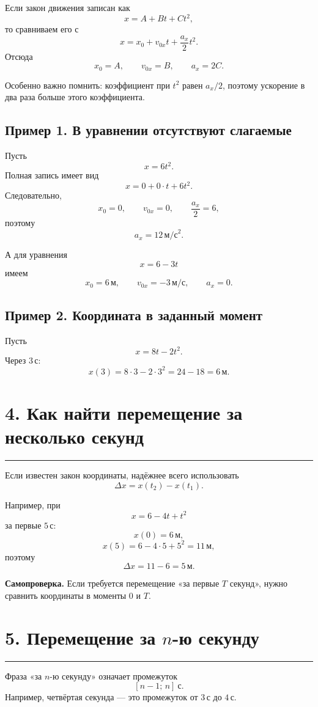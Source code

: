 \documentclass[a4paper,12pt]{article}
\newcommand{\sectionline}{%
  \vspace{0.1em}
  \noindent\textcolor{accent}{\rule{\linewidth}{0.5pt}}
  \vspace{0.45em}
}
\newcommand{\ms}{\,\text{м/с}}
\newcommand{\mss}{\,\text{м/с}^{2}}
\newcommand{\metre}{\,\text{м}}
\newcommand{\second}{\,\text{с}}
\begin{document}
Если закон движения записан как
\[
  x=A+Bt+Ct^2,
\]
то сравниваем его с
\[
  x=x_0+v_{0x}t+\frac{a_x}{2}t^2.
\]
Отсюда
\[
\boxed{x_0=A,\qquad v_{0x}=B,\qquad a_x=2C.}
\]

Особенно важно помнить: коэффициент при $t^2$ равен $a_x/2$, поэтому ускорение в два раза больше этого коэффициента.

\subsection*{Пример 1. В уравнении отсутствуют слагаемые}

Пусть
\[
  x=6t^2.
\]
Полная запись имеет вид
\[
  x=0+0\cdot t+6t^2.
\]
Следовательно,
\[
  x_0=0,
  \qquad
  v_{0x}=0,
  \qquad
  \frac{a_x}{2}=6,
\]
поэтому
\[
  \boxed{a_x=12\mss.}
\]

А для уравнения
\[
  x=6-3t
\]
имеем
\[
  \boxed{x_0=6\metre,\qquad v_{0x}=-3\ms,\qquad a_x=0.}
\]

\subsection*{Пример 2. Координата в заданный момент}

Пусть
\[
  x=8t-2t^2.
\]
Через $3\second$:
\[
  x(3)=8\cdot3-2\cdot3^2=24-18=6\metre.
\]

\section*{4. Как найти перемещение за несколько секунд}
\sectionline

Если известен закон координаты, надёжнее всего использовать
\[
\boxed{\Delta x=x(t_2)-x(t_1).}
\]

Например, при
\[
  x=6-4t+t^2
\]
за первые $5\second$:
\[
  x(0)=6\metre,
\]
\[
  x(5)=6-4\cdot5+5^2=11\metre,
\]
поэтому
\[
  \boxed{\Delta x=11-6=5\metre.}
\]

\textbf{Самопроверка.}
Если требуется перемещение «за первые $T$ секунд», нужно сравнить координаты в моменты $0$ и $T$.

\section*{5. Перемещение за $n$-ю секунду}
\sectionline

Фраза «за $n$-ю секунду» означает промежуток
\[
  [n-1;\,n]\ \text{с}.
\]
Например, четвёртая секунда --- это промежуток от $3\second$ до $4\second$.
\end{document}
